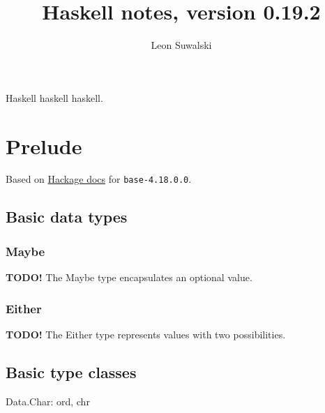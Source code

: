 \documentclass{charun}
\title{Haskell notes, version 0.19.2}
\author{Leon Suwalski}
\begin{document}
\begin{multicols*}{3}
\maketitle
\raggedright
Haskell haskell haskell.
\section{Prelude}
Based on \href{https://hackage.haskell.org/package/base-4.18.0.0/docs/Prelude.html}{Hackage docs} for \texttt{base-4.18.0.0}.

\subsection{Basic data types}




\subsubsection{Maybe}
\textbf{TODO!}
The Maybe type encapsulates an optional value.

\subsubsection{Either}
\textbf{TODO!}
The Either type represents values with two possibilities.





\subsection{Basic type classes}









\newpage








Data.Char: ord, chr


\end{multicols*}
\end{document}
